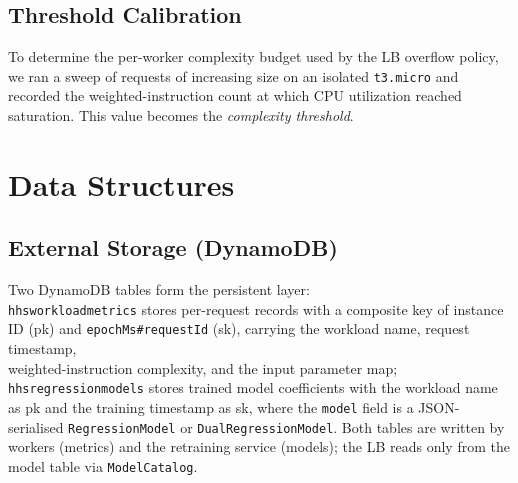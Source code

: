 \documentclass[10pt]{article}
\begin{document}
\subsection{Threshold Calibration}
To determine the per-worker complexity budget used by the LB overflow policy,
we ran a sweep of requests of increasing size on an isolated \texttt{t3.micro}
and recorded the weighted-instruction count at which CPU utilization reached
saturation. This value becomes the \emph{complexity threshold}.

\section{Data Structures}

\subsection{External Storage (DynamoDB)}
Two DynamoDB tables form the persistent layer:\\
\texttt{hhs\-workload\-metrics} stores per-request records with a composite
key of instance ID (pk) and \texttt{epoch\-Ms\#\-request\-Id} (sk), carrying
the workload name, request timestamp,\\ weighted-instruction complexity, and the
input parameter map; \texttt{hhs\-regression\-models} stores trained model
coefficients with the workload name as pk and the training timestamp as sk,
where the \texttt{model} field is a JSON-serialised \texttt{Regression\-Model}
or \texttt{Dual\-Regression\-Model}. Both tables are written by workers (metrics)
and the retraining service (models); the LB reads only from the model table
via \texttt{ModelCatalog}.
\end{document}
